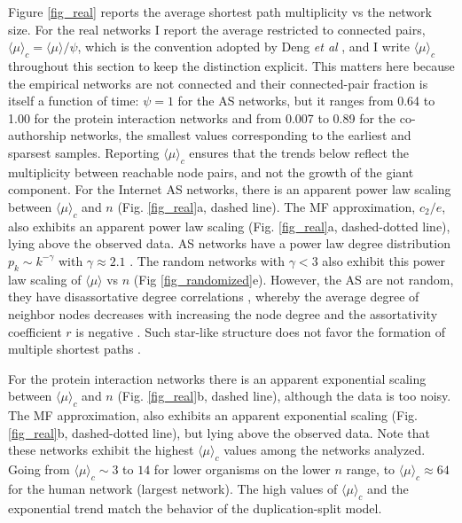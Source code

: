 \documentclass[reprint,aps,pre,amsmath,amssymb,superscriptaddress,showpacs]{revtex4-1}
\begin{document}
Figure \ref{fig_real} reports the average shortest path multiplicity vs the network size. For the real networks I report the average restricted to connected pairs, $\langle\mu\rangle_c = \langle\mu\rangle/\psi$, which is the convention adopted by Deng {\em et al} \cite{deng2026multipath}, and I write $\langle\mu\rangle_c$ throughout this section to keep the distinction explicit. This matters here because the empirical networks are not connected and their connected-pair fraction is itself a function of time: $\psi=1$ for the AS networks, but it ranges from 0.64 to 1.00 for the protein interaction networks and from 0.007 to 0.89 for the co-authorship networks, the smallest values corresponding to the earliest and sparsest samples. Reporting $\langle\mu\rangle_c$ ensures that the trends below reflect the multiplicity between reachable node pairs, and not the growth of the giant component. For the Internet AS networks, there is an apparent power law scaling between $\langle \mu \rangle_c$ and $n$ (Fig. \ref{fig_real}a, dashed line). The MF approximation, $c_2/e$, also exhibits an apparent power law scaling  (Fig. \ref{fig_real}a, dashed-dotted line), lying above the observed data. AS networks have a power law degree distribution $p_k\sim k^{-\gamma}$ with $\gamma\approx 2.1$ \cite{pastor-satorras01, internet_vazquez02}. The random networks with $\gamma<3$ also exhibit this power law scaling of $\langle \mu \rangle$ vs $n$ (Fig \ref{fig_randomized}e). However, the AS are not random, they have disassortative degree correlations \cite{pastor-satorras01, internet_vazquez02}, whereby the average degree of neighbor nodes decreases with increasing the node degree \cite{pastor-satorras01, internet_vazquez02} and the assortativity coefficient $r$ is negative \cite{newman02a}. Such star-like structure does not favor the formation of multiple shortest paths \cite{pastor-satorras01, internet_vazquez02}.

For the protein interaction networks there is an apparent exponential scaling between $\langle \mu \rangle_c$ and $n$ (Fig. \ref{fig_real}b, dashed line), although the data is too noisy. The MF approximation, also exhibits an apparent exponential scaling  (Fig. \ref{fig_real}b, dashed-dotted line), but lying above the observed data. Note that these networks exhibit the highest $\langle \mu \rangle_c$ values among the networks analyzed. Going from $\langle \mu \rangle_c\sim 3$ to $14$ for lower organisms on the lower $n$ range, to $\langle \mu \rangle_c\approx 64$ for the human network (largest network). The high values of $\langle \mu \rangle_c$ and the exponential trend match the behavior of the duplication-split model.
\end{document}
